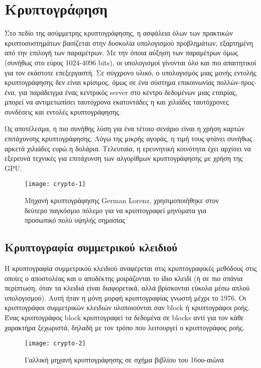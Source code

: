\section{Κρυπτογράφηση}
Στο πεδίο της ασύμμετρης κρυπτογράφησης, η ασφάλεια όλων των πρακτικών κρυπτοσυστημάτων βασίζεται στην δυσκολία υπολογισμού προβλημάτων, εξαρτημένη από την επιλογή των παραμέτρων. Με την όποια αύξηση των παραμέτρων όμως (συνήθως στο εύρος 1024-4096 bits), οι υπολογισμοί γίνονται όλο και πιο απαιτητικοί για τον εκάστοτε επεξεργαστή. Σε σύγχρονο υλικό, ο υπολογισμός μιας μονής εντολής κρυπτογράφησης δεν είναι κρίσιμος, όμως σε ένα σύστημα επικοινωνίας πολλών-προς-ένα, για παράδειγμα ένας κεντρικός server στο κέντρο δεδομένων μιας εταιρίας, μπορεί να αντιμετωπίσει ταυτόχρονα εκατοντάδες η και χιλιάδες ταυτόχρονες συνδέσεις και εντολές κρυπτογράφησης.

Ως αποτέλεσμα, η πιο συνήθης λύση για ένα τέτοιο σενάριο είναι η χρήση καρτών επιτάχυνσης κρυπτογράφησης. Λόγω της μικρής αγοράς, η τιμή τους φτάνει συνήθως αρκετά χιλιάδες ευρώ η δολάρια.
Τελευταία, η ερευνητική κοινότητα έχει αρχίσει να εξερευνά τεχνικές για επιτάχυνση των αλγορίθμων κρυπτογράφησης με χρήση της GPU.  

\begin{figure}[h]
\centering
\texttt{[image: crypto-1]}
\caption{Μηχανή κρυπτογράφησης German Lorenz, χρησιμοποιήθηκε στον δεύτερο παγκόσμιο πόλεμο για να κρυπτογραφεί μηνύματα για προσωπικό πολύ υψηλής σημασίας}
\end{figure}

\subsection{Κρυπτογραφία συμμετρικού κλειδιού}
Η κρυπτογραφία συμμετρικού κλειδιού αναφέρεται στις κρυπτογραφικές μεθόδους στις οποίες ο αποστολέας και ο αποδέκτης μοιράζονται το ίδιο κλειδί (ή σε πιο σπάνια περίπτωση, όταν τα κλειδιά είναι διαφορετικά, αλλά βρίσκονται εύκολα μέσω απλού υπολογισμού). Αυτή ήταν η μόνη μορφή κρυπτογραφίας γνωστή μέχρι το 1976.
Οι κρυπτογράφοι συμμετρικών κλειδιών υλοποιούνται σαν block ή κρυπτογράφοι ροής. Ένας κρυπτογράφος block κρυπτογραφεί τα δεδομένα σε blocks αντί για τον κάθε χαρακτήρα ξεχωριστά, δηλαδή με τον τρόπο που λειτουργεί ο κρυπτογράφος ροής.


\begin{figure}[h]
\centering
\texttt{[image: crypto-2]}
\caption{Γαλλική μηχανή κρυπτογράφησης σε σχήμα βιβλίου του 16ου-αιώνα}
\end{figure}

